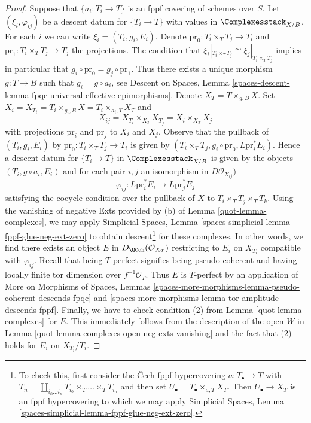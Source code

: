 \begin{proof}
\medskip\noindent
Suppose that $\{a_i : T_i \to T\}$ is an fppf covering of schemes over $S$.
Let $(\xi_i, \varphi_{ij})$ be a descent datum for $\{T_i \to T\}$
with values in $\Complexesstack_{X/B}$.
For each $i$ we can write $\xi_i = (T_i, g_i, E_i)$.
Denote $\text{pr}_0 : T_i \times_T T_j \to T_i$ and
$\text{pr}_1 : T_i \times_T T_j \to T_j$ the projections.
The condition that $\xi_i|_{T_i \times_T T_j} \cong \xi_j|_{T_i \times_T T_j}$
implies in particular that $g_i \circ \text{pr}_0 = g_j \circ \text{pr}_1$.
Thus there exists a unique morphism $g : T \to B$ such that
$g_i = g \circ a_i$, see
Descent on Spaces, Lemma
\ref{spaces-descent-lemma-fpqc-universal-effective-epimorphisms}.
Denote $X_T = T \times_{g, B} X$. Set
$X_i = X_{T_i} = T_i \times_{g_i, B} X = T_i \times_{a_i, T} X_T$
and
$$
X_{ij} = X_{T_i} \times_{X_T} X_{T_j} = X_i \times_{X_T} X_j
$$
with projections $\text{pr}_i$ and $\text{pr}_j$ to $X_i$ and $X_j$.
Observe that the pullback of $(T_i, g_i, E_i)$
by $\text{pr}_0 : T_i \times_T T_j \to T_i$ is given by
$(T_i \times_T T_j, g_i \circ \text{pr}_0, L\text{pr}_i^*E_i)$.
Hence a descent datum for $\{T_i \to T\}$ in $\Complexesstack_{X/B}$
is given by the objects $(T_i, g \circ a_i, E_i)$
and for each pair $i, j$ an isomorphism in
$D\mathcal{O}_{X_{ij}})$
$$
\varphi_{ij} :
L\text{pr}_i^*E_i \longrightarrow L\text{pr}_j^*E_j
$$
satisfying the cocycle condition over the pullback of $X$ to
$T_i \times_T T_j \times_T T_k$.
Using the vanishing of negative Exts provided by (b) of
Lemma \ref{quot-lemma-complexes}, we may apply
Simplicial Spaces, Lemma \ref{spaces-simplicial-lemma-fppf-glue-neg-ext-zero}
to obtain descent\footnote{To check this, first consider the
{\v C}ech fppf hypercovering $a : T_\bullet \to T$ with
$T_n = \coprod_{i_0 \ldots i_n} T_{i_0} \times_T \ldots \times_T T_{i_n}$
and then set $U_\bullet = T_\bullet \times_{a, T} X_T$. Then
$U_\bullet \to X_T$ is an fppf hypercovering to which we may
apply Simplicial Spaces, Lemma
\ref{spaces-simplicial-lemma-fppf-glue-neg-ext-zero}.}
for these complexes. In other words, we find there exists an object
$E$ in $D_\QCoh(\mathcal{O}_{X_T})$ restricting to $E_i$ on $X_{T_i}$
compatible with $\varphi_{ij}$. Recall that being
$T$-perfect signifies being pseudo-coherent and having
locally finite tor dimension over $f^{-1}\mathcal{O}_T$.
Thus $E$ is $T$-perfect by an application of
More on Morphisms of Spaces, Lemmas
\ref{spaces-more-morphisms-lemma-pseudo-coherent-descends-fpqc} and
\ref{spaces-more-morphisms-lemma-tor-amplitude-descends-fppf}.
Finally, we have to check condition (2) from
Lemma \ref{quot-lemma-complexes} for $E$.
This immediately follows from the description of the open $W$
in Lemma \ref{quot-lemma-complexes-open-neg-exts-vanishing}
and the fact that (2) holds for $E_i$ on $X_{T_i}/T_i$.
\end{proof}

